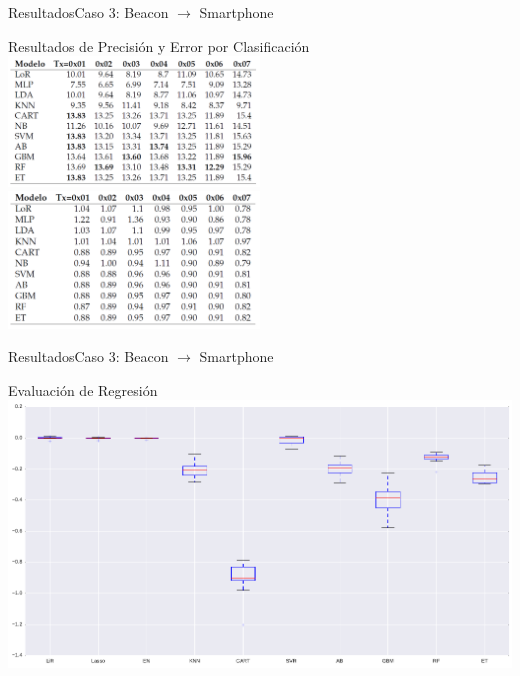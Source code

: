\documentclass[10pt]{beamer}
\begin{document}
\begin{frame}{Resultados}{Caso 3: Beacon $\rightarrow$ Smartphone}
\begin{block}{Resultados de Precisión y Error por Clasificación}
\includegraphics[width=0.5\textwidth]{AAUgraphics/movClasificacion}
\includegraphics[width=0.5\textwidth]{AAUgraphics/movClasificacionErr}
\end{block}
\end{frame}
\begin{frame}{Resultados}{Caso 3: Beacon $\rightarrow$ Smartphone}
\begin{block}{Evaluación de Regresión}
\includegraphics[width=1.0\textwidth]{AAUgraphics/movTx07Reg}
\end{block}
\end{frame}
\end{document}
